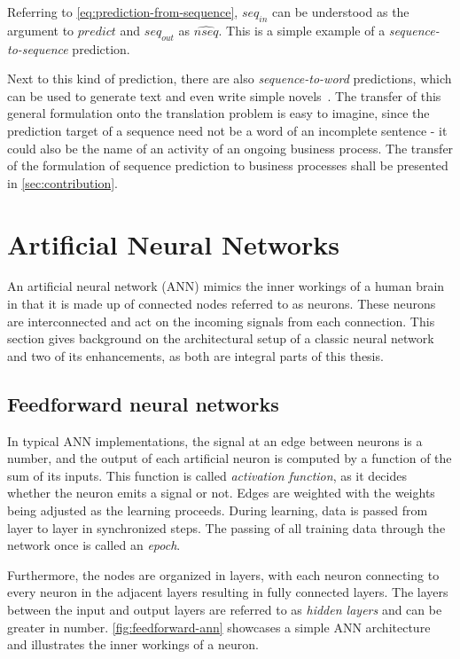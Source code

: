 Referring to \autoref{eq:prediction-from-sequence}, $seq_{in}$ can be understood as the argument to $predict$ and $seq_{out}$ as $\widehat{nseq}$. This is a simple example of a \textit{sequence-to-sequence} prediction.

Next to this kind of prediction, there are also \textit{sequence-to-word} predictions, which can be used to generate text and even write simple novels~\cite{web:text-generation-machinelearningmastery, web:text-generation-freecodecamp}. The transfer of this general formulation onto the translation problem is easy to imagine, since the prediction target of a sequence need not be a word of an incomplete sentence - it could also be the name of an activity of an ongoing business process. The transfer of the formulation of sequence prediction to business processes shall be presented in \autoref{sec:contribution}.

\section{Artificial Neural Networks}
An artificial neural network (ANN) mimics the inner workings of a human brain in that it is made up of connected nodes referred to as neurons. These neurons are interconnected and act on the incoming signals from each connection. This section gives background on the architectural setup of a classic neural network and two of its enhancements, as both are integral parts of this thesis.

\subsection{Feedforward neural networks}
In typical ANN implementations, the signal at an edge between neurons is a number, and the output of each artificial neuron is computed by a function of the sum of its inputs. This function is called \textit{activation function}, as it decides whether the neuron emits a signal or not. Edges are weighted with the weights being adjusted as the learning proceeds. During learning, data is passed from layer to layer in synchronized steps. The passing of all training data through the network once is called an \textit{epoch}.

Furthermore, the nodes are organized in layers, with each neuron connecting to every neuron in the adjacent layers resulting in fully connected layers. The layers between the input and output layers are referred to as \textit{hidden layers} and  can be greater in number. \autoref{fig:feedforward-ann} showcases a simple ANN architecture and illustrates the inner workings of a neuron.

